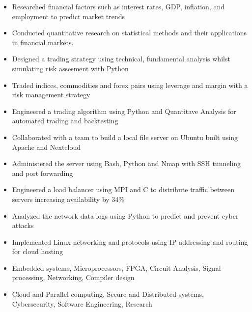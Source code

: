 \documentclass[11pt,a4paper,ragged2e]{altacv}
\begin{document}
\begin{paracol}{1}
\begin{itemize}
\item Researched financial factors such as interest rates, GDP, inflation, and employment to predict market trends
\item Conducted quantitative research on statistical methods and their applications in financial markets.
\item Designed a trading strategy using technical, fundamental analysis whilst simulating risk assesment with Python
\item Traded indices, commodities and forex pairs using leverage and margin with a risk management strategy 
\item Engineered a trading algorithm using Python and Quantitave Analysis for automated trading and backtesting
\end{itemize}
\tightdivider

\begin{itemize}
\item Collaborated with a team to build a local file server on Ubuntu built using Apache and Nextcloud
\item Administered the server using Bash, Python and Nmap with SSH tunneling and port forwarding
\item Engineered a load balancer using MPI and C to distribute traffic between servers increasing availability by 34\%
\item Analyzed the network data logs using Python to predict and prevent cyber attacks
\item Implemented Linux networking and protocols using IP addressing and routing for cloud hosting
\end{itemize}

\medskip

\begin{itemize} 
\item Embedded systems, Microprocessors, FPGA, Circuit Analysis, Signal processing, Networking,  Compiler design
\item Cloud and Parallel computing, Secure and Distributed systems, Cybersecurity, Software Engineering, Research
\end{itemize}


\end{paracol}
\end{document}
